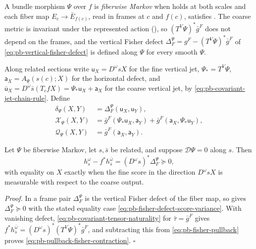 A bundle morphism \(\Psi\) over \(f\) is \emph{fiberwise Markov} when 
holds at both scales and each fiber map \(E_c\to\bar E_{f(c)}\), read in frames at \(c\) and
\(f(c)\), satisfies . The coarse metric is invariant under the
represented action (), so \((T^V\Psi)^*\bar g^F\) does not
depend on the frames, and the vertical Fisher defect \(\Delta_F^\Psi=g^F-(T^V\Psi)^*\bar g^F\) of
\eqref{eq:pb-vertical-fisher-defect} is defined along \(\Psi\) for every smooth \(\Psi\).

Along related sections write \(\mathsf u_X=D^\omega sX\) for the fine vertical jet, \(\Psi_*=T^V\Psi\),
\(\mathsf a_X=A_\Psi(s(c);X)\) for the horizontal defect, and
\(\bar{\mathsf u}_X=D^{\bar\omega}\bar s(T_cfX)=\Psi_*\mathsf u_X+\mathsf a_X\) for the coarse vertical
jet, by \eqref{eq:pb-covariant-jet-chain-rule}. Define
\begin{align}
\delta_\Psi(X,Y)&=\Delta_F^\Psi(\mathsf u_X,\mathsf u_Y),
\label{eq:pb-base-fisher-defect}\\
\mathcal X_\Psi(X,Y)&=\bar g^F(\Psi_*\mathsf u_X,\mathsf a_Y)+\bar g^F(\mathsf a_X,\Psi_*\mathsf u_Y),
\label{eq:pb-cross-anomaly-tensor}\\
\mathcal Q_\Psi(X,Y)&=\bar g^F(\mathsf a_X,\mathsf a_Y).
\label{eq:pb-quadratic-anomaly-tensor}
\end{align}

Let \(\Psi\) be fiberwise Markov, let \(s,\bar s\) be related, and suppose \(\mathcal D\Psi=0\) along
\(s\). Then
\begin{equation}
h_s^\omega-f^*h_{\bar s}^{\bar\omega}
=(D^\omega s)^*\Delta_F^\Psi\succeq0,
\label{eq:pb-pullback-fisher-contraction}
\end{equation}
with equality on \(X\) exactly when the fine score in the direction \(D^\omega sX\) is measurable with
respect to the coarse output. 

\noindent\emph{Proof.}
In a frame pair \(\Delta_F^\Psi\) is the vertical Fisher defect of the fiber map, so
 gives \(\Delta_F^\Psi\succeq0\) with the stated equality case
\eqref{eq:pb-fisher-defect-score-variance}. With vanishing defect,
\eqref{eq:pb-covariant-tensor-naturality} for \(\bar\tau=\bar g^F\) gives
\(f^*h_{\bar s}^{\bar\omega}=(D^\omega s)^*(T^V\Psi)^*\bar g^F\), and subtracting this from
\eqref{eq:pb-fisher-pullback} proves \eqref{eq:pb-pullback-fisher-contraction}. \hfill$\square$

